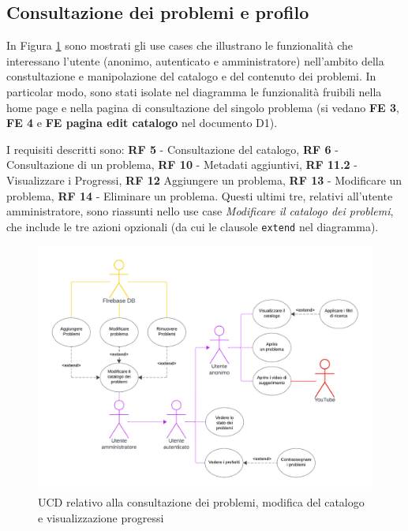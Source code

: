\documentclass[11pt, a4paper]{article}
\theoremstyle{definition} %
\begin{document}
\newpage
\subsection{Consultazione dei problemi e profilo}
In Figura \ref{catalogueprobs} sono mostrati gli use cases che illustrano
le funzionalità che interessano l'utente (anonimo, autenticato e amministratore)
nell'ambito della constultazione e manipolazione del catalogo e del contenuto
dei problemi. In particolar modo, sono stati isolate nel diagramma le funzionalità
fruibili nella home page e nella pagina di consultazione
del singolo problema (si vedano \textbf{FE 3}, \textbf{FE 4} e \textbf{FE pagina edit catalogo} nel documento D1).

I requisiti descritti sono: \textbf{RF 5} - Consultazione del catalogo,
\textbf{RF 6} - Consultazione di un problema, \textbf{RF 10} - Metadati aggiuntivi,
\textbf{RF 11.2} - Visualizzare i Progressi, \textbf{RF 12}  Aggiungere un problema,
\textbf{RF 13} - Modificare un problema, \textbf{RF 14} - Eliminare un problema.
Questi ultimi tre, relativi all'utente amministratore, sono riassunti nello use case
\textit{Modificare il catalogo dei problemi}, che include le tre azioni opzionali (da
cui le clausole \texttt{extend} nel diagramma).


\begin{figure}[H]
\centering
\hspace*{-2cm}
\includegraphics[scale=0.75]{materiale/ucdiagrams/ucproblemi.pdf}
\caption{UCD relativo alla consultazione dei problemi, modifica del catalogo e visualizzazione progressi}
\label{catalogueprobs}
\end{figure}
\end{document}
